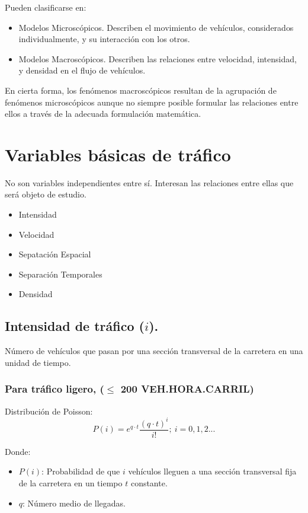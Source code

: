 Pueden clasificarse en:
\begin{itemize}
    \item Modelos Microscópicos. Describen el movimiento de vehículos, considerados individualmente, y su interacción con los otros.
    \item Modelos Macroscópicos. Describen las relaciones entre velocidad, intensidad, y densidad en el flujo de vehículos.
\end{itemize}

En cierta forma, los fenómenos macroscópicos resultan de la agrupación de fenómenos microscópicos aunque no siempre posible formular las relaciones entre ellos a través de la adecuada formulación matemática.

\section{Variables básicas de tráfico}
No son variables independientes entre sí. Interesan las relaciones entre ellas que será objeto de estudio.
\begin{itemize}
    \item Intensidad
    \item Velocidad
    \item Sepatación Espacial
    \item Separación Temporales
    \item Densidad
\end{itemize}

\subsection{Intensidad de tráfico ($i$).}
Número de vehículos que pasan por una sección transversal de la carretera en una unidad de tiempo.

\subsubsection{Para tráfico ligero, ($\leq$ 200 VEH.HORA.CARRIL)}

Distribución de Poisson:
\begin{equation}
    P(i) = e^{q \cdot t} \frac{(q \cdot t)^i}{i!};\  i = 0,1,2...
\end{equation}

Donde:
\begin{itemize}
    \item $P(i)$: Probabilidad de que $i$ vehículos lleguen a una sección transversal fija de la carretera en un tiempo $t$ constante.
    \item $q$: Número medio de llegadas.
\end{itemize}

